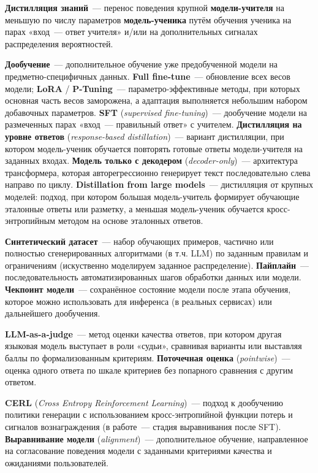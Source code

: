 \documentclass[times]{itmo-student-thesis}
\begin{document}
\medskip\noindent\textbf{Дистилляция знаний}~--- перенос поведения крупной
\textbf{модели-учителя} на меньшую по числу параметров \textbf{модель-ученика}
путём обучения ученика на парах «вход~--- ответ учителя» и/или на дополнительных
сигналах распределения вероятностей.

\medskip\noindent\textbf{Дообучение}~--- дополнительное обучение уже предобученной
модели на предметно-специфичных данных. \textbf{Full fine-tune}~--- обновление всех
весов модели; \textbf{LoRA} / \textbf{P-Tuning}~--- параметро-эффективные методы,
при которых основная часть весов заморожена, а адаптация выполняется небольшим
набором добавочных параметров.
\textbf{SFT} (\emph{supervised fine-tuning})~--- дообучение модели на размеченных
парах «вход~--- правильный ответ» с учителем.
\textbf{Дистилляция на уровне ответов} (\emph{response-based distillation})~---
вариант дистилляции, при котором модель-ученик обучается повторять готовые
ответы модели-учителя на заданных входах. \textbf{Модель только с декодером}
(\emph{decoder-only})~--- архитектура трансформера, которая авторегрессионно генерирует текст
последовательно слева направо по циклу.
\textbf{Distillation from large models}~--- дистилляция от крупных моделей:
подход, при котором большая модель-учитель формирует обучающие эталонные ответы или
разметку, а меньшая модель-ученик обучается кросс-энтропийным методом на основе эталонных ответов.

\medskip\noindent\textbf{Синтетический датасет}~--- набор обучающих примеров,
частично или полностью сгенерированных алгоритмами (в т.ч. LLM) по заданным правилам
и ограничениям (искуственно моделируем заданное распределение).
\textbf{Пайплайн}~--- последовательность автоматизированных шагов обработки
данных или модели. \textbf{Чекпоинт модели}~--- сохранённое состояние модели
после этапа обучения, которое можно использовать для инференса (в реальных сервисах) или дальнейшего
дообучения.

\medskip\noindent\textbf{LLM-as-a-judge}~--- метод оценки качества ответов,
при котором другая языковая модель выступает в роли «судьи», сравнивая варианты
или выставляя баллы по формализованным критериям.
\textbf{Поточечная оценка} (\emph{pointwise})~--- оценка одного ответа по шкале критериев без
попарного сравнения с другим ответом.

\medskip\noindent\textbf{CERL} (\emph{Cross Entropy Reinforcement Learning})~---
подход к дообучению политики генерации с использованием кросс-энтропийной функции
потерь и сигналов вознаграждения (в работе~--- стадия выравнивания после SFT).
\textbf{Выравнивание модели} (\emph{alignment})~--- дополнительное обучение,
направленное на согласование поведения модели с заданными критериями качества
и ожиданиями пользователей.
\end{document}
